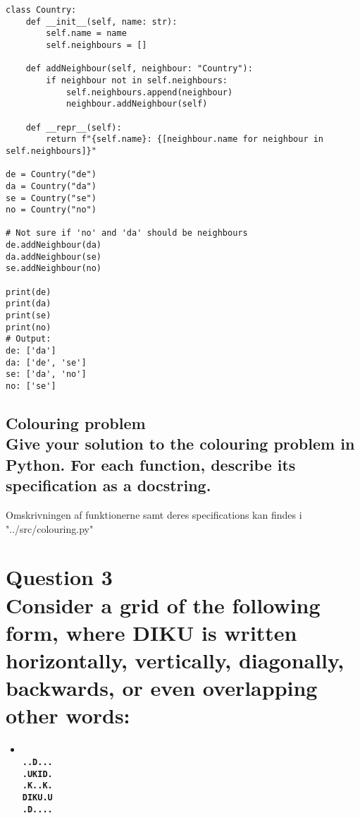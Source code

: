 \documentclass[a4paper,12pt]{article}
\begin{document}
\begin{lstlisting}
class Country:
    def __init__(self, name: str):
        self.name = name
        self.neighbours = []
    
    def addNeighbour(self, neighbour: "Country"):
        if neighbour not in self.neighbours:
            self.neighbours.append(neighbour)
            neighbour.addNeighbour(self)
    
    def __repr__(self):
        return f"{self.name}: {[neighbour.name for neighbour in self.neighbours]}"
    
de = Country("de")
da = Country("da")
se = Country("se")
no = Country("no")
    
# Not sure if 'no' and 'da' should be neighbours
de.addNeighbour(da)
da.addNeighbour(se)
se.addNeighbour(no)
    
print(de)
print(da)
print(se)
print(no)
# Output:
de: ['da']
da: ['de', 'se']
se: ['da', 'no']
no: ['se']
\end{lstlisting}


\subsection[Colouring problem]{Colouring problem\\
Give your solution to the colouring problem in Python. For each function, describe its specification as a docstring.}

Omskrivningen af funktionerne samt deres specifications kan findes i "../src/colouring.py"

\section[Question 3 - DIKU]{Question 3\\
Consider a grid of the following form, where DIKU is written horizontally, vertically, diagonally, backwards, or even overlapping other words:}
\begin{itemize}
    \item[] \textbf{\\
    \lstinline{..D...}\\
    \lstinline{.UKID.}\\
    \lstinline{.K..K.}\\
    \lstinline{DIKU.U}\\
    \lstinline{.D....}}
\end{itemize}
\end{document}
